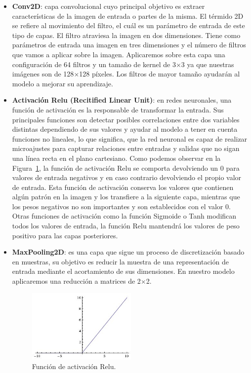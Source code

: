 \begin{itemize}
    \item \textbf{Conv2D}: capa convolucional cuyo principal objetivo es extraer características de la imagen de entrada o partes de la misma.
    El térmido 2D se refiere al movimiento del filtro, el cuál es un parámetro de entrada de este tipo de capas.
    El filtro atraviesa la imagen en dos dimensiones.
    Tiene como parámetros de entrada una imagen en tres dimensiones y el número de filtros que vamos a aplicar sobre la imagen.
    Aplicaremos sobre esta capa una configuración de 64 filtros y un tamaño de kernel de 3$\times$3 ya que nuestras imágenes son de 128$\times$128 píxeles. Los filtros de mayor tamaño ayudarán al modelo a mejorar su aprendizaje.
    \item \textbf{Activación Relu (Recitified Linear Unit)}: en redes neuronales, una función de activación es la responsable de transformar la entrada.
    Sus principales funciones son detectar posibles correlaciones entre dos variables distintas dependiendo de sus valores y ayudar al modelo a tener en cuenta funciones no lineales, lo que significa, que la red neuronal es capaz de realizar microajustes para capturar relaciones entre entradas y salidas que no sigan una línea recta en el plano cartesiano.
    Como podemos observar en la Figura~\ref{fig:Función de activación Relu}, la función de activación Relu se comporta devolviendo un 0 para valores de entrada negativos y en caso contrario devolviendo el propio valor de entrada.
    Esta función de activación conserva los valores que contienen algún patrón en la imagen y los transfiere a la siguiente capa, mientras que los pesos negativos no son importantes y son establecidos con el valor 0.
    Otras funciones de activación como la función Sigmoide o Tanh modifican todos los valores de entrada, la función Relu mantendrá los valores de peso positivo para las capas posteriores.
    \item \textbf{MaxPooling2D}: es una capa que sigue un proceso de discretización basado en muestras, su objetivo es reducir la muestra de una representación de entrada mediante el acortamiento de sus dimensiones.
    En nuestro modelo aplicaremos una reducción a matrices de 2$\times$2.

    \begin{figure}
    \centering
    \includegraphics[width=0.5\textwidth]{images/chapter2/relu.jpg}
    \caption{Función de activación Relu.}
    \label{fig:Función de activación Relu}
    \end{figure}


\end{itemize}
